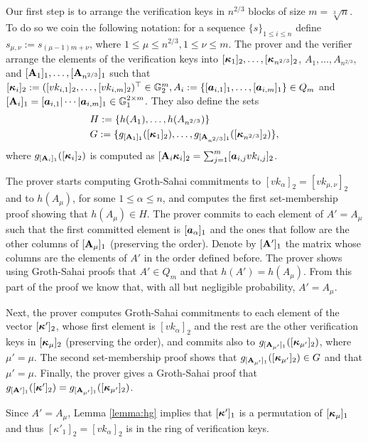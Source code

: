 Our first step is to arrange the verification keys in $n^{2/3}$ blocks of size $m=\sqrt[3]{n}$. To do so we coin the following notation: for a sequence $\{s\}_{1\leq i \leq n}$ define $s_{\mu,\nu}:=s_{(\mu-1)m+\nu}$, where  $1\leq\mu\leq n^{2/3},1\leq \nu\leq m$.  The prover and the verifier arrange the elements of the verification keys into $[{\boldsymbol{\kappa}}_1]_2,\ldots, [{\boldsymbol{\kappa}}_{n^{2/3}}]_2$, $A_1,\ldots, A_{n^{2/3}}$, and $[\mathbf{{A}}_1]_1,\ldots, [\mathbf{{A}}_{n^{2/3}}]_1$ such that $[{\boldsymbol{\kappa}}_i]_2:= ([vk_{i,1}]_2,\ldots,[vk_{i,m}]_2)^\top\in\mathbb{G}^m_2, A_i:=\{[{\boldsymbol{a}}_{i,1}]_1,\ldots,[{\boldsymbol{a}}_{i,m}]_1\}\in Q_m$ and $[\mathbf{{A}}_i]_1=[{\boldsymbol{a}}_{i,1}|\cdots|{\boldsymbol{a}}_{i,m}]_1\in\mathbb{G}^{2\times m}_1$. They also define the sets
\begin{align*}
&H:=\{h(A_1),\ldots,\allowbreak h(A_{n^{2/3}})\}\\
&G:=\{g_{[\mathbf{{A}}_1]_1}([{\boldsymbol{\kappa}}_1]_2),\allowbreak\ldots,g_{[\mathbf{{A}}_{n^{2/3}}]_1}([{\boldsymbol{\kappa}}_{n^{2/3}}]_2)\},
\end{align*}
where $g_{[\mathbf{{A}}_i]_1}([{\boldsymbol{\kappa}}_i]_2)$ is computed as $[\mathbf{{A}}_i{\boldsymbol{\kappa}}_i]_2=\sum_{j=1}^m [{\boldsymbol{a}}_{i,j}vk_{i,j}]_2$.

The prover starts computing Groth-Sahai commitments to $[vk_\alpha]_2=[vk_{\mu,\nu}]_2$ and to $h(A_\mu)$, for some $1\leq \alpha \leq n$, and computes the first set-membership proof showing that $h(A_\mu)\in H$.
The prover commits to each element of $A'=A_\mu$ such that the first committed element is $[{\boldsymbol{a}}_\alpha]_1$ and the ones that follow are the other columns of $[\mathbf{{A}}_\mu]_1$ (preserving the order). Denote by $[\mathbf{{A}}']_1$ the matrix whose columns are the elements of $A'$ in the order defined before.  The prover shows using Groth-Sahai proofs that $A'\in Q_m$ and that $h(A')=h(A_\mu)$. From this part of the proof we know that, with all but negligible probability, $A'=A_\mu$.

Next, the prover computes Groth-Sahai commitments to each element of the vector $[{\boldsymbol{\kappa}}']_2$, whose first element is $[vk_\alpha]_2$ and the rest are the other verification keys in $[{\boldsymbol{\kappa}}_\mu]_2$ (preserving the order), and commits also to $g_{[\mathbf{{A_{\mu'}}}]_1}([{\boldsymbol{\kappa}}_{\mu'}]_2)$, where $\mu'=\mu$. The second set-membership proof shows that $g_{[\mathbf{{A_{\mu'}}}]_1}([{\boldsymbol{\kappa}}_{\mu'}]_2)\in G$ and that $\mu'=\mu$. Finally, the prover gives a Groth-Sahai proof that $g_{[\mathbf{{A}}']_1}([{\boldsymbol{\kappa}}']_2)=g_{[\mathbf{{A_{\mu'}}}]_1}([{\boldsymbol{\kappa}}_{\mu'}]_2)$.

Since $A'=A_\mu$, Lemma \ref{lemma:hg} implies that $[{\boldsymbol{\kappa}}']_1$ is a permutation of $[{\boldsymbol{\kappa}}_\mu]_1$ and thus $[\kappa'_1]_2=[vk_\alpha]_2$ is in the ring of verification keys.